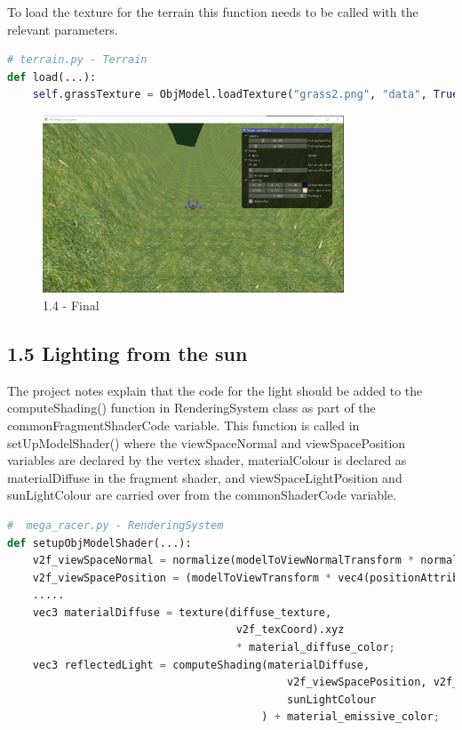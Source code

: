 \documentclass[a4 paper, 12pt]{article}
\begin{document}
To load the texture for the terrain this function needs to be called with the relevant parameters.
    \begin{lstlisting}[language=python]   
# terrain.py - Terrain
def load(...):
    self.grassTexture = ObjModel.loadTexture("grass2.png", "data", True)
    \end{lstlisting}

\begin{figure} [H]
    \centering
    \includegraphics[width=0.8\textwidth, frame]
        {./images/mega_racer/1.4.PNG}
    \caption{1.4 - Final}
\end{figure}



\subsection{1.5 Lighting from the sun}  

The project notes explain that the code for the light should be added to the computeShading() function in RenderingSystem class as part of the commonFragmentShaderCode variable. This function is called in setUpModelShader() where the viewSpaceNormal and viewSpacePosition variables are declared by the vertex shader, materialColour is declared as materialDiffuse in the fragment shader, and viewSpaceLightPosition and sunLightColour are carried over from the commonShaderCode variable. 
    \begin{lstlisting}[language=python] 
#  mega_racer.py - RenderingSystem
def setupObjModelShader(...):
    v2f_viewSpaceNormal = normalize(modelToViewNormalTransform * normalAttribute);
    v2f_viewSpacePosition = (modelToViewTransform * vec4(positionAttribute, 1.0)).xyz;
    .....
    vec3 materialDiffuse = texture(diffuse_texture, 
                                    v2f_texCoord).xyz 
                                    * material_diffuse_color;
    vec3 reflectedLight = computeShading(materialDiffuse, 
                                            v2f_viewSpacePosition, v2f_viewSpaceNormal, viewSpaceLightPosition, 
                                            sunLightColour
                                        ) + material_emissive_color;
    \end{lstlisting}
\end{document}
